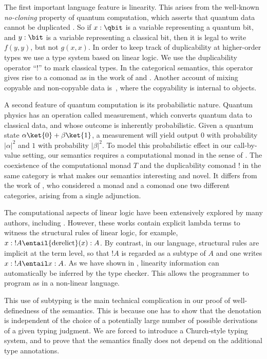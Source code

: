\documentclass{llncs}
\begin{document}
The first important language feature is linearity. This arises from
the well-known {\em no-cloning} property of quantum computation, which
asserts that quantum data cannot be duplicated {\cite{WZ82}}. So if
$x:\qbit$ is a variable representing a quantum bit, and $y:\bit$ is a
variable representing a classical bit, then it is legal to write
$f(y,y)$, but not $g(x,x)$. 
In order to keep track of duplicability at higher-order types we use
a type system based on linear logic. We use the duplicability operator
``$!$'' to mark classical types.
In the categorical semantics, this
operator gives rise to a comonad as in the work of {\cite{Seely89}}
and {\cite{benton92linear}}.
Another account of mixing copyable and non-copyable data is~\cite{coecke06quantum},
where the copyability is internal to objects.

A second feature of quantum computation is its probabilistic nature.
Quantum physics has an operation called measurement, which converts
quantum data to classical data, and whose outcome is inherently
probabilistic. Given a quantum state $\alpha\ket{0}+\beta\ket{1}$, a
measurement will yield output $0$ with probability $|\alpha|^2$ and
$1$ with probability $|\beta|^2$.  To model this probabilistic effect
in our call-by-value setting, our semantics requires a computational
monad in the sense of {\cite{moggi91notions}}. The coexistence of the
computational monad $T$ and the duplicability comonad $!$ in the same
category is what makes our semantics interesting and novel. It differs
from the work of \cite{benton96linear}, who considered a monad and a
comonad one two different categories, arising from a single
adjunction.

The computational aspects of linear logic have been extensively
explored by many authors, including \cite{bierman93intuitionistic,benton92linear,benton93term,abramsky93computational,wadler92substitute}. However, these works contain explicit
lambda terms to witness the structural rules of linear logic, for
example, $x:{!A}\entail{\rm derelict}(x):A$. By contrast, in our
language, structural rules are implicit at the term level, so that
$!A$ is regarded as a subtype of $A$ and one writes $x:{!A}\entail
x:A$. As we have shown in {\cite{selinger05lambda}}, linearity
information can automatically be inferred by the type checker.  This
allows the programmer to program as in a non-linear language. 

This use of subtyping is the main technical complication in our proof
of well-definedness of the semantics. This is because one has to show
that the denotation is independent of the choice of a potentially
large number of possible derivations of a given typing judgment. We
are forced to introduce a Church-style typing system, and to prove
that the semantics finally does not depend on the additional type
annotations.
\end{document}

